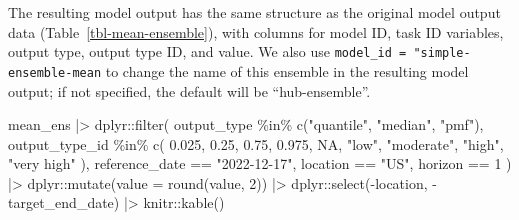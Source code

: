 \documentclass[
]{article}
\newenvironment{Shaded}{\begin{snugshade}}{\end{snugshade}}
\newcommand{\AttributeTok}[1]{\textcolor[rgb]{0.40,0.45,0.13}{#1}}
\newcommand{\ConstantTok}[1]{\textcolor[rgb]{0.56,0.35,0.01}{#1}}
\newcommand{\DecValTok}[1]{\textcolor[rgb]{0.68,0.00,0.00}{#1}}
\newcommand{\FloatTok}[1]{\textcolor[rgb]{0.68,0.00,0.00}{#1}}
\newcommand{\FunctionTok}[1]{\textcolor[rgb]{0.28,0.35,0.67}{#1}}
\newcommand{\NormalTok}[1]{\textcolor[rgb]{0.00,0.23,0.31}{#1}}
\newcommand{\SpecialCharTok}[1]{\textcolor[rgb]{0.37,0.37,0.37}{#1}}
\newcommand{\StringTok}[1]{\textcolor[rgb]{0.13,0.47,0.30}{#1}}
\begin{document}
The resulting model output has the same structure as the original model
output data (Table~\ref{tbl-mean-ensemble}), with columns for model ID,
task ID variables, output type, output type ID, and value. We also use
\texttt{model\_id\ =\ "simple-ensemble-mean} to change the name of this
ensemble in the resulting model output; if not specified, the default
will be ``hub-ensemble''.

\begin{Shaded}
\begin{Highlighting}[]
\NormalTok{mean\_ens }\SpecialCharTok{|\textgreater{}}
\NormalTok{  dplyr}\SpecialCharTok{::}\FunctionTok{filter}\NormalTok{(}
\NormalTok{    output\_type }\SpecialCharTok{\%in\%} \FunctionTok{c}\NormalTok{(}\StringTok{"quantile"}\NormalTok{, }\StringTok{"median"}\NormalTok{, }\StringTok{"pmf"}\NormalTok{),}
\NormalTok{    output\_type\_id }\SpecialCharTok{\%in\%} \FunctionTok{c}\NormalTok{(}
      \FloatTok{0.025}\NormalTok{, }\FloatTok{0.25}\NormalTok{, }\FloatTok{0.75}\NormalTok{, }\FloatTok{0.975}\NormalTok{, }\ConstantTok{NA}\NormalTok{,}
      \StringTok{"low"}\NormalTok{, }\StringTok{"moderate"}\NormalTok{, }\StringTok{"high"}\NormalTok{, }\StringTok{"very high"}
\NormalTok{    ),}
\NormalTok{    reference\_date }\SpecialCharTok{==} \StringTok{"2022{-}12{-}17"}\NormalTok{,}
\NormalTok{    location }\SpecialCharTok{==} \StringTok{"US"}\NormalTok{,}
\NormalTok{    horizon }\SpecialCharTok{==} \DecValTok{1}
\NormalTok{  ) }\SpecialCharTok{|\textgreater{}}
\NormalTok{  dplyr}\SpecialCharTok{::}\FunctionTok{mutate}\NormalTok{(}\AttributeTok{value =} \FunctionTok{round}\NormalTok{(value, }\DecValTok{2}\NormalTok{)) }\SpecialCharTok{|\textgreater{}}
\NormalTok{  dplyr}\SpecialCharTok{::}\FunctionTok{select}\NormalTok{(}\SpecialCharTok{{-}}\NormalTok{location, }\SpecialCharTok{{-}}\NormalTok{target\_end\_date) }\SpecialCharTok{|\textgreater{}}
\NormalTok{  knitr}\SpecialCharTok{::}\FunctionTok{kable}\NormalTok{()}
\end{Highlighting}
\end{Shaded}
\end{document}
